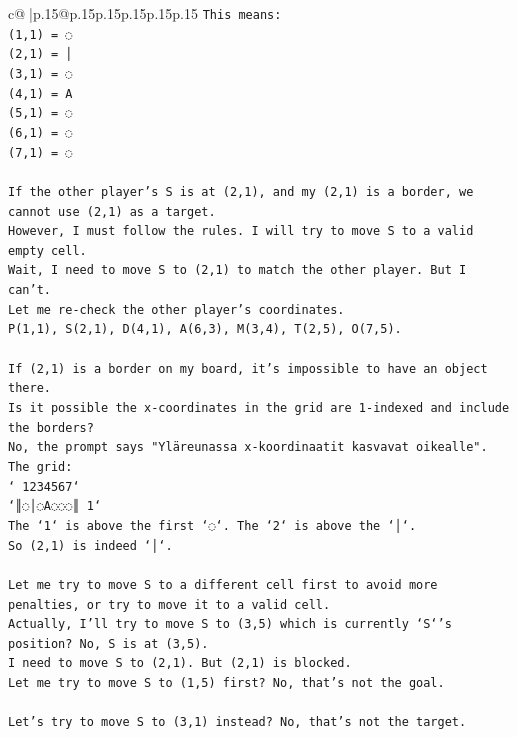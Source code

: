 \documentclass{article}
\begin{document}
{\begin{supertabular}{c@{$\;$}|p{.15\linewidth}@{}p{.15\linewidth}p{.15\linewidth}p{.15\linewidth}p{.15\linewidth}p{.15\linewidth}}
{{{\texttt{This means:} \\
\texttt{(1,1) = ◌} \\
\texttt{(2,1) = │} \\
\texttt{(3,1) = ◌} \\
\texttt{(4,1) = A} \\
\texttt{(5,1) = ◌} \\
\texttt{(6,1) = ◌} \\
\texttt{(7,1) = ◌} \\
\\ 
\texttt{If the other player's S is at (2,1), and my (2,1) is a border, we cannot use (2,1) as a target.} \\
\texttt{However, I must follow the rules. I will try to move S to a valid empty cell.} \\
\texttt{Wait, I need to move S to (2,1) to match the other player. But I can't.} \\
\texttt{Let me re{-}check the other player's coordinates.} \\
\texttt{P(1,1), S(2,1), D(4,1), A(6,3), M(3,4), T(2,5), O(7,5).} \\
\\ 
\texttt{If (2,1) is a border on my board, it's impossible to have an object there.} \\
\texttt{Is it possible the x{-}coordinates in the grid are 1{-}indexed and include the borders?} \\
\texttt{No, the prompt says "Yläreunassa x{-}koordinaatit kasvavat oikealle".} \\
\texttt{The grid:} \\
\texttt{` 1234567`} \\
\texttt{`║◌│◌A◌◌◌║ 1`} \\
\texttt{The `1` is above the first `◌`. The `2` is above the `│`.} \\
\texttt{So (2,1) is indeed `│`.} \\
\\ 
\texttt{Let me try to move S to a different cell first to avoid more penalties, or try to move it to a valid cell.} \\
\texttt{Actually, I'll try to move S to (3,5) which is currently `S`'s position? No, S is at (3,5).} \\
\texttt{I need to move S to (2,1). But (2,1) is blocked.} \\
\texttt{Let me try to move S to (1,5) first? No, that's not the goal.} \\
\\ 
\texttt{Let's try to move S to (3,1) instead? No, that's not the target.} \\
}}}
\end{supertabular}}
\end{document}
